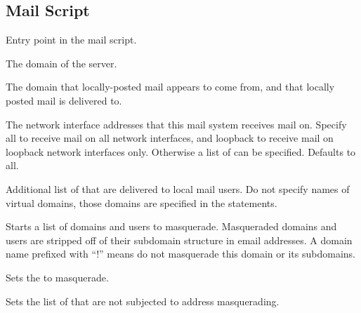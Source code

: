 \subsection{Mail Script}



Entry point in the mail script.


The domain  of the server.


The domain  that locally-posted mail appears to come
from, and that locally posted mail is delivered to.


The network interface addresses that this mail system receives mail on.
Specify all to receive mail on all network interfaces,
and loopback to receive mail on loopback network interfaces only. Otherwise
a list of  can be specified.
Defaults to all.


Additional list of  that are delivered to local mail users.
Do not specify names of virtual domains, those domains are specified
in the  statements.


Starts a list of domains and users to masquerade. Masqueraded domains and
users are stripped off of their subdomain structure in email addresses.
A domain name prefixed with ``!'' means do not masquerade this domain
or its subdomains.


Sets the  to masquerade.


Sets the list of  that are not subjected to address masquerading.

